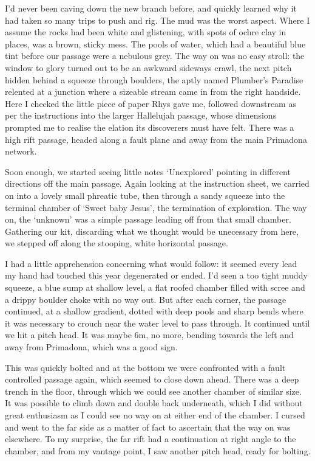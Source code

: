 I’d never been caving  down the new branch before, and quickly learned why it had taken so many trips to push and rig. The mud was the worst aspect. Where I assume the rocks had been white and glistening, with spots of ochre clay in places, was a brown, sticky mess. The pools of water, which had a beautiful blue tint before our passage were a nebulous grey.  The way on was no easy stroll: the window to glory turned out to be an awkward sideways crawl,  the next pitch hidden behind a squeeze through boulders, the aptly named Plumber’s Paradise relented at a junction where a sizeable stream came in from the right handside. Here I checked the little piece of paper Rhys gave me, followed downstream as per the instructions into the larger Hallelujah passage, whose dimensions prompted me to realise the elation its discoverers must have felt. There was a high rift passage, headed along a fault plane and away from the main Primadona network.

Soon enough, we started seeing little notes ‘Unexplored’ pointing in different directions off the main passage.  Again looking at the instruction sheet, we carried on into a lovely small phreatic tube, then through a sandy squeeze into the terminal chamber of ‘Sweet baby Jesus’, the termination of exploration. The way on, the ‘unknown’ was a simple passage leading off from that small chamber. Gathering our kit, discarding what we thought would be unecessary from here, we stepped off along the stooping, white horizontal passage. 

I had a little apprehension concerning what would follow: it seemed every lead my hand had touched this year degenerated or ended. I’d seen a too tight muddy squeeze, a blue sump at shallow level, a flat roofed chamber filled with scree and a drippy boulder choke with no way out. But after each corner, the passage continued, at a shallow gradient, dotted with deep pools and sharp bends where it was necessary to crouch near the water level to pass through. It continued until we hit a pitch head. It was maybe 6m, no more, bending towards the left and away from Primadona, which was a good sign. 

This was quickly bolted and at the bottom we were confronted with a fault controlled passage again, which seemed to close down ahead. There was a deep trench in the floor, through which we could see another chamber of similar size. It was possible to climb down and double back underneath, which I did without great enthusiasm as I could see no way on at either end of the chamber. I cursed and went to the far side as a matter of fact to ascertain that the way on was elsewhere. To my surprise, the far rift had a continuation at right angle to the chamber, and from my vantage point, I saw another pitch head, ready for bolting. 

